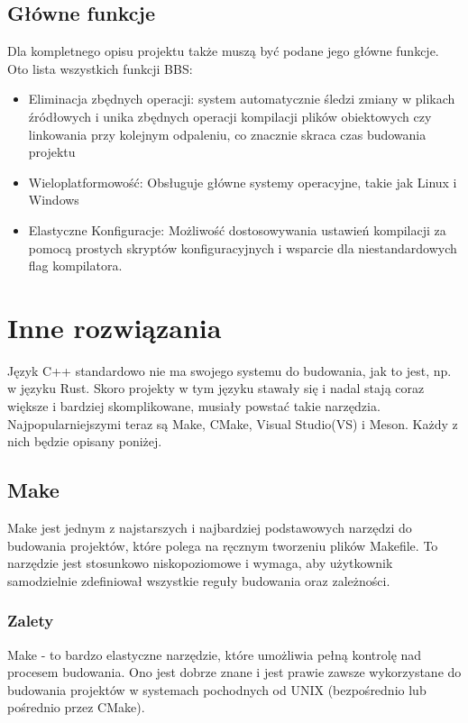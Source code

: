 \subsection{Główne funkcje}
Dla kompletnego opisu projektu także muszą być podane jego główne funkcje. Oto lista wszystkich funkcji BBS:

\begin{itemize}
    \item Eliminacja zbędnych operacji: system automatycznie śledzi zmiany w plikach źródłowych i unika zbędnych operacji kompilacji plików obiektowych czy linkowania przy kolejnym odpaleniu, co znacznie skraca czas budowania projektu
    \item Wieloplatformowość: Obsługuje główne systemy operacyjne, takie jak Linux i Windows
    \item Elastyczne Konfiguracje: Możliwość dostosowywania ustawień kompilacji za pomocą prostych skryptów konfiguracyjnych i wsparcie dla niestandardowych flag kompilatora.
\end{itemize}

\section{Inne rozwiązania}
Język C++ standardowo nie ma swojego systemu do budowania, jak to jest, np. w języku Rust. Skoro projekty w tym języku stawały się i nadal stają coraz większe i bardziej skomplikowane, musiały powstać takie narzędzia. Najpopularniejszymi teraz są Make, CMake, Visual Studio(VS) i Meson. Każdy z nich będzie opisany poniżej.

\subsection{Make}
Make jest jednym z najstarszych i najbardziej podstawowych narzędzi do budowania projektów, które polega na ręcznym tworzeniu plików Makefile. To narzędzie jest stosunkowo niskopoziomowe i wymaga, aby użytkownik samodzielnie zdefiniował wszystkie reguły budowania oraz zależności.

\subsubsection{Zalety}
Make - to bardzo elastyczne narzędzie, które umożliwia pełną kontrolę nad procesem budowania. Ono jest dobrze znane i jest prawie zawsze wykorzystane do budowania projektów w systemach pochodnych od UNIX (bezpośrednio lub pośrednio przez CMake).

